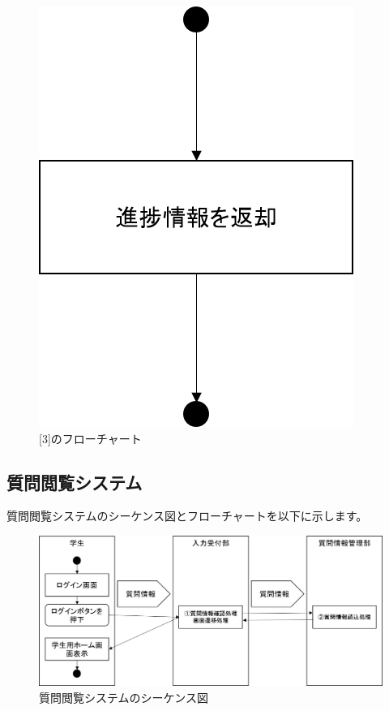 \begin{figure}[htbp]
  \begin{center}
    \includegraphics[width=0.3\linewidth,clip]{./img/preg_check/sub3.png}
    \caption{[3]のフローチャート}\label{fig:pregcheckflow1}
  \end{center}
\end{figure}

\newpage
\subsection{質問閲覧システム}
質問閲覧システムのシーケンス図とフローチャートを以下に示します。

\begin{figure}[htbp]
  \begin{center}
    \includegraphics[width=1\linewidth,clip]{./img/q_read/main.png}
    \caption{質問閲覧システムのシーケンス図}\label{fig:qreadseaquence}
  \end{center}
\end{figure}

